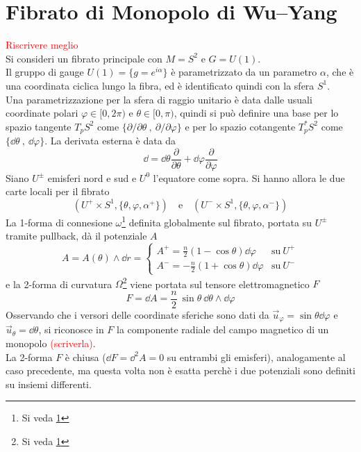 \section{Fibrato di Monopolo di Wu–Yang}
\textcolor{red}{Riscrivere meglio}\\
Si consideri un fibrato principale con $M = S^2$ e $G = U(1)$.\\
Il gruppo di gauge $U(1) = \{g = e^{i\alpha} \}$ è parametrizzato da un
parametro $\alpha$, che è una coordinata ciclica lungo la fibra, ed è identificato
quindi con la sfera $S^1$.\\
Una parametrizzazione per la sfera di raggio unitario è data dalle usuali
coordinate polari $\varphi  \in[0,2\pi)$ e $\theta \in [0,\pi)$,
quindi si può definire una base per lo spazio tangente $T_pS^2$ come
$\{ \partial / \partial \theta \: , \: \partial / \partial \varphi  \}$
e per lo spazio cotangente $T^*_pS^2$ come $\{ \dd \theta \: , \: \dd \varphi  \}$.
La derivata esterna è data da
$$
   \dd  = \dd \theta \frac{\partial}{\partial \theta}
        + \dd \varphi    \frac{\partial}{\partial \varphi  }
$$
Siano $U^\pm$ emisferi nord e sud e $U^0$ l'equatore come sopra.
Si hanno allora le due carte locali per il fibrato
$$
   ( U^+ \times S^1 , \{ \theta, \varphi ,\alpha^+ \} ) \quad \mathrm{e}\quad
   ( U^- \times S^1 , \{ \theta, \varphi ,\alpha^- \} )
$$
La 1-forma di connesione $\omega$\footnote{Si veda \ref{}}
definita globalmente sul fibrato, portata su $U^\pm$ tramite pullback,
dà il potenziale $A$
$$
   A = A(\theta)\wedge \dd r =  \begin{cases}
      A^+ =  \frac{n}{2}(1 - \cos\theta ) \dd \varphi  & \mathrm{su \:} U^+ \\
      A^- = -\frac{n}{2}(1 + \cos\theta ) \dd \varphi  & \mathrm{su \:} U^-
   \end{cases}
$$
e la 2-forma di curvatura $\Omega$\footnote{Si veda \ref{}} viene portata
sul tensore elettromagnetico $F$
$$
   F = \dd A = \frac{n}{2} \: \sin\theta \: \dd \theta \wedge \dd \varphi
$$
Osservando che i versori delle coordinate sferiche sono dati da
$\vec u _\varphi  = \sin\theta \dd \varphi $ e $ \vec u _\theta = \dd \theta$,
si riconosce in $F$ la componente radiale del campo magnetico di un monopolo
\textcolor{red}{(scriverla)}.\\

La 2-forma $F$ è chiusa ($\dd F = \dd ^2A = 0$ su entrambi gli emisferi),
analogamente al caso precedente, ma questa volta non è esatta perchè i due potenziali
sono definiti su insiemi differenti.\\

